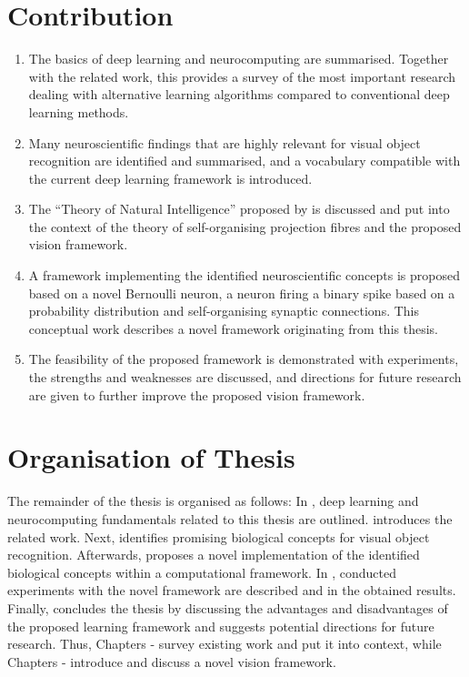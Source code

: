 \section{Contribution}
\begin{enumerate}
	\item The basics of deep learning and neurocomputing are summarised. Together with the related work, this provides a survey of the most important research dealing with alternative learning algorithms compared to conventional deep learning methods.
    \item Many neuroscientific findings that are highly relevant for visual object recognition are identified and summarised, and a vocabulary compatible with the current deep learning framework is introduced.
	\item The ``Theory of Natural Intelligence'' proposed by  is discussed and put into the context of the theory of self-organising projection fibres  and the proposed vision framework.
	\item A framework implementing the identified neuroscientific concepts is proposed based on a novel Bernoulli neuron,  a neuron firing a binary spike based on a probability distribution and self-organising synaptic connections. This conceptual work describes a novel framework originating from this thesis. 
    \item The feasibility of the proposed framework is demonstrated with experiments, the strengths and weaknesses are discussed, and directions for future research are given to further improve the proposed vision framework.
\end{enumerate}


\section{Organisation of Thesis}
The remainder of the thesis is organised as follows: In , deep learning and neurocomputing fundamentals related to this thesis are outlined.
 introduces the related work. Next,  identifies promising biological concepts for visual object recognition.
Afterwards,  proposes a novel implementation of the identified biological concepts within a computational framework.
In , conducted experiments with the novel framework are described and in  the obtained results.
Finally,  concludes the thesis by discussing the advantages and disadvantages of the proposed learning framework and suggests potential directions for future research.
Thus, Chapters - survey existing work and put it into context, while Chapters - introduce and discuss a novel vision framework.
